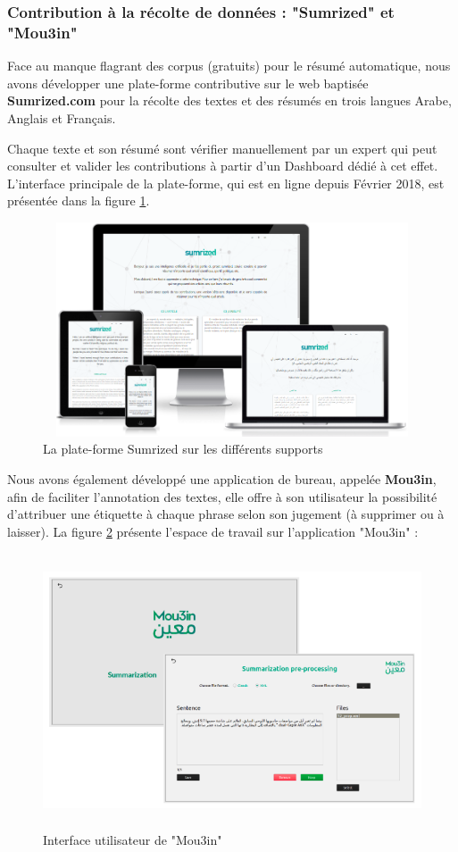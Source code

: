     \subsubsection{Contribution à la récolte de données : "Sumrized" et "Mou3in"}
    Face au manque flagrant des corpus (gratuits) pour le résumé automatique, nous avons développer une plate-forme contributive sur le web baptisée \textbf{Sumrized.com} pour la récolte des textes et des résumés en trois langues Arabe, Anglais et Français. 
    
    Chaque texte et son résumé sont vérifier manuellement par un expert qui peut consulter et valider les contributions à partir d'un Dashboard dédié à cet effet. L'interface principale de la plate-forme, qui est en ligne depuis Février 2018, est présentée dans la figure \ref{sumrized-ui}. 
    
    \begin{figure}[H]
        \centering
        \includegraphics[height=180pt,width=320pt]{img/chapter4/sumrized/responsive.png}
        \caption{La plate-forme Sumrized sur les différents supports}
        \label{sumrized-ui}
    \end{figure} 
    
    Nous avons également développé une application de bureau, appelée \textbf{Mou3in}, afin de faciliter l'annotation des textes, elle offre à son utilisateur la possibilité d'attribuer une étiquette à chaque phrase selon son jugement (à supprimer ou à laisser). La figure \ref{mou3in} présente l'espace de travail sur l'application "Mou3in" :
    \begin{figure}[H]
        \centering
        \includegraphics[height=230pt,width=370pt]{img/chapter4/mou3in/mou3in.png}
        \caption{Interface utilisateur de "Mou3in"}
        \label{mou3in}
    \end{figure}
    
